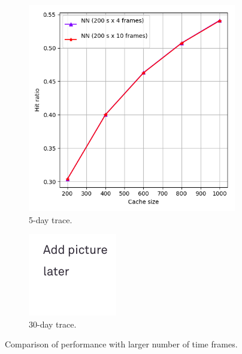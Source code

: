 \begin{figure}[b!]
	\centering
	
	\begin{subfigure}[b]{0.49\linewidth}
		\includegraphics[width=\linewidth]{pics/cache5.png}
		\caption{5-day trace.}
	\end{subfigure}
	\begin{subfigure}[b]{0.49\linewidth}
		\includegraphics[width=\linewidth]{pics/todo.png}
		\caption{30-day trace.}
	\end{subfigure}
	\caption{Comparison of performance with larger number of time frames.}
	\label{fig:cache5}
\end{figure}


